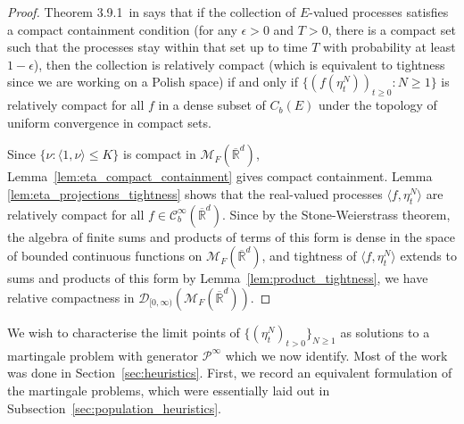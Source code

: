 \documentclass[EJP]{ejpecp} %
\newcommand{\IR}{\mathbb R}
\newcommand{\Pgen}{\mathcal{P}}    %
\newcommand{\cmeasures}{\mathcal{M}_F(\overline{\IR}^d)} %
\begin{document}
\begin{proof}
    Theorem 3.9.1~in \cite{ethier/kurtz:1986}
    says that if the collection of $E$-valued processes
    satisfies a compact containment condition
    (for any $\epsilon > 0$ and $T>0$, there is a compact set
    such that the processes stay within that set up to time $T$ with probability at least $1-\epsilon$),
    then the collection is relatively compact (which is equivalent to tightness
since we are working on a Polish space)
    if and only if
    $\{(f(\eta^{N}_t))_{t \geq 0}: N \geq 1\}$ is relatively compact
    for all $f$ in a dense subset of $C_b(E)$
    under the topology of uniform convergence in compact sets.

Since $\{ \nu: \langle 1, \nu \rangle \leq K \} $ is compact in $\cmeasures$,
    Lemma~\ref{lem:eta_compact_containment}
    gives compact containment.
    Lemma \ref{lem:eta_projections_tightness}
    shows that the real-valued processes $\langle f, \eta^{N}_t \rangle$
    are relatively compact for all 
$f \in \mathcal{C}^{\infty}_{b}(\overline{\IR}^d)$.
    Since by the Stone-Weierstrass theorem,
    the algebra of finite sums and products of terms of this form
    is dense in the space of bounded continuous functions on $\cmeasures$,
    and tightness of $\langle f, \eta_t^N \rangle$ extends to sums and products of this form
    by Lemma~\ref{lem:product_tightness},
    we have relative compactness in $\mathcal{D}_{[0,\infty)}(\cmeasures)$.
\end{proof}


We wish to characterise the limit points of
$\{(\eta^{N}_t)_{t>0}\}_{N\geq 1}$ as solutions to a martingale problem 
with generator $\Pgen^{\infty}$ which we now identify. Most of the work
was done in Section~\ref{sec:heuristics}.
First, we record an equivalent formulation
of the martingale problems,
which were essentially laid out in Subsection~\ref{sec:population_heuristics}.
\end{document}
